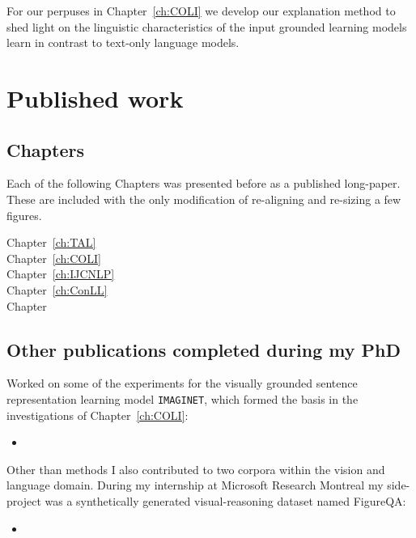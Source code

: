 For our perpuses in Chapter~\ref{ch:COLI} we develop our explanation method to
shed light on the linguistic characteristics of the input grounded learning
models learn in contrast to text-only language models.

\section{Published work}

\subsection{Chapters}

Each of the following Chapters was presented before as a published long-paper. These are included with
the only modification of re-aligning and re-sizing a few figures.

\begin{description}
	\item[Chapter~\ref{ch:TAL}] 
	\item[Chapter~\ref{ch:COLI}] 
	\item[Chapter~\ref{ch:IJCNLP}] 
	\item[Chapter~\ref{ch:ConLL}] 
	\item[Chapter ] 
\end{description}

\subsection{Other publications completed during my PhD}

Worked on some of the experiments for the visually grounded sentence representation learning
model \texttt{IMAGINET}, which formed the basis in the investigations of Chapter~\ref{ch:COLI}:

\begin{itemize}
\item {}
\end{itemize}

Other than methods I also contributed to two corpora within the vision and language domain.
During my internship at Microsoft Research Montreal my side-project was a synthetically generated visual-reasoning
dataset named FigureQA:

\begin{itemize}
\item {}
\end{itemize}

